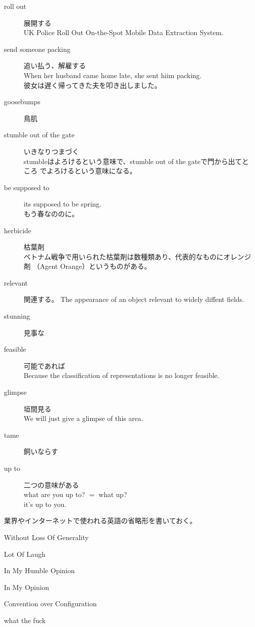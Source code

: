 \begin{description}
		\item[roll out] 展開する \\
		UK Police Roll Out On-the-Spot Mobile Data Extraction System.
		\item[send someone packing] 追い払う、解雇する \\
		When her husband came home late, she sent hiim packing. \\
		彼女は遅く帰ってきた夫を叩き出しました。
		\item[goosebumps] 鳥肌
		\item[stumble out of the gate] いきなりつまづく \\
		stumbleはよろけるという意味で、stumble out of the gateで門から出てところ
		でよろけるという意味になる。
		\item[be supposed to] its supposed to be spring. \\
		もう春なののに。
		\item[herbicide] 枯葉剤 \\
		ベトナム戦争で用いられた枯葉剤は数種類あり、代表的なものにオレンジ剤
		（Agent Orange）というものがある。
		\item[relevant] 関連する。
		The appearance of an object relevant to widely diffent fields.
		\item[stunning] 見事な
		\item[feasible] 可能であれば \\
		Because the classification of representations is no longer feasible.
		\item[glimpse] 垣間見る \\
		We will just give a glimpse of this area.
		\item[tame] 飼いならす \\
		\item[up to] 二つの意味がある \\
		what are you up to? $=$  what up? \\
		it's up to you.
	\end{description} %

	業界やインターネットで使われる英語の省略形を書いておく。
	\begin{description}\setlength{\itemsep}{-1mm} %
		\item[WOLOG] Without Loss Of Generality
		\item[LOL] Lot Of Laugh
		\item[IMHO] In My Humble Opinion
		\item[IMO] In My Opinion
		\item[CoC] Convention over Configuration
		\item[WTF] what the fuck
	\end{description} %
